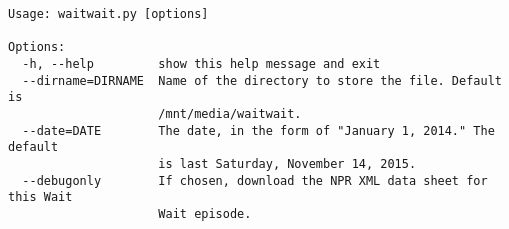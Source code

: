 \begin{verbatim}
Usage: waitwait.py [options]

Options:
  -h, --help         show this help message and exit
  --dirname=DIRNAME  Name of the directory to store the file. Default is
                     /mnt/media/waitwait.
  --date=DATE        The date, in the form of "January 1, 2014." The default
                     is last Saturday, November 14, 2015.
  --debugonly        If chosen, download the NPR XML data sheet for this Wait
                     Wait episode.
\end{verbatim}